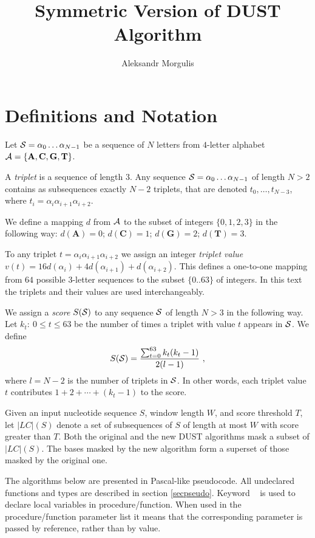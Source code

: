 \documentclass{article}
\title{Symmetric Version of DUST Algorithm}
\author{Aleksandr Morgulis}
\newcommand{\al}[1]{\alpha_{#1}}
\newcommand{\sq}[2]{\al{#1}\ldots\al{#2}}
\newcommand{\cala}{{\cal A}}
\newcommand{\cals}{{\cal S}}
\newcommand{\VARP}{\keyword{var}\ }
\begin{document}
\maketitle
\tableofcontents

\section{Definitions and Notation}

Let ${\cal S} = \sq{0}{N-1}$  be a sequence of $N$ letters from $4$-letter 
alphabet $\cala = \{ \mathbf A, \mathbf C, \mathbf G, \mathbf T \}$.

A {\em triplet} is a sequence of length $3$. Any sequence $\cals = \sq{0}{N-1}$ 
of length $N > 2$ contains as subsequences exactly $N-2$ triplets, that are 
denoted $t_{0},\ldots,t_{N-3}$, where $t_i = \al{i}\al{i+1}\al{i+2}$.

We define a mapping $d$ from $\cala$ to the subset of integers 
$\{0, 1, 2, 3\}$ in the following way: $d(\mathbf A) = 0$; $d(\mathbf C) = 1$; 
$d(\mathbf G) = 2$; $d(\mathbf T) = 3$.

To any triplet $t = \al{i}\al{i+1}\al{i+2}$ we assign an integer 
{\em triplet value} $v(t) = 16d(\al{i}) + 4d(\al{i+1}) + d(\al{i+2})$. This 
defines a one-to-one mapping from $64$ possible 3-letter sequences to the subset 
$\{0..63\}$ of integers.  In this text the triplets and their values are used 
interchangeably.

We assign a {\em score} $S(\cals)$ to any sequence $\cals$ of length $N > 3$ in 
the following way. Let $k_t :\ 0 \le t \le 63$ be the number of times a triplet 
with value $t$ appears in $\cals$. We define
$$
S(\cals) = \frac{\sum_{t=0}^{63}{k_t(k_t - 1)}}{2(l - 1)} \rm{\ ,}
$$
where $l = N - 2$ is the number of triplets in $\cals$. In other words, each
triplet value $t$ contributes $1 + 2 + \cdots + (k_t - 1)$ to the score.

Given an input nucleotide sequence $S$, window length $W$, and score threshold
$T$, let $|LC|(S)$ denote a set of subsequences of $S$ of length at most $W$ with
score greater than $T$. Both the original and the new DUST algorithms mask a subset 
of $|LC|(S)$. The bases masked by the new algorithm form a superset of those masked 
by the original one.

The algorithms below are presented in Pascal-like pseudocode. All undeclared
functions and types are described in section \ref{secpseudo}. Keyword \VARP
is used to declare local variables in procedure/function. When used in
the procedure/function parameter list it means that the corresponding parameter
is passed by reference, rather than by value.
\end{document}
